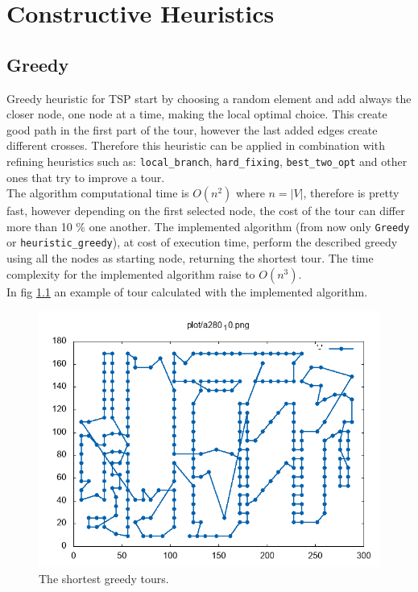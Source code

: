 \chapter{Constructive Heuristics}

\section{Greedy}\label{sec:greedy}
Greedy heuristic for TSP start by choosing a random element and add always the closer node, one node at a time, making the local optimal choice. This create good path in the first part of the tour, however the last added edges create different crosses. Therefore this heuristic can be applied in combination with refining heuristics such as: \texttt{local\_branch}, \texttt{hard\_fixing}, \texttt{best\_two\_opt} and other ones that try to improve a tour.\\
The algorithm computational time is $ O(n^2) $ where $ n = |V| $, therefore is pretty fast, however depending on the first selected node, the cost of the tour can differ more than 10 \% one another. The implemented algorithm (from now only \texttt{Greedy} or \texttt{heuristic\_greedy}), at cost of execution time, perform the described greedy using all the nodes as starting node, returning the shortest tour. The time complexity for the implemented algorithm raise to $ O(n^3) $.\\
In fig \ref{fig:a280_10_} an example of tour calculated with the implemented algorithm.

\begin{figure}[h]
	\centering
	\centering
	\includegraphics[width=0.7\columnwidth]{../res/a280_10.png}
	\caption{The shortest greedy tours.}
	\label{fig:a280_10_}
\end{figure}



